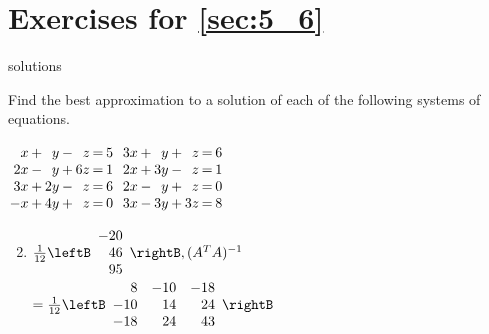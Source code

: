 
\section*{Exercises for \ref{sec:5_6}}

\begin{Filesave}{solutions}
\end{Filesave}

\begin{multicols}{2}
\begin{ex}
Find the best approximation to a solution of each of the following systems of equations.

\begin{exenumerate}
\exitem $\arraycolsep=1pt
\begin{array}[t]{rlrlrcr}
 x & + &  y & - &  z & = & 5 \\
2x & - &  y & + & 6z & = & 1 \\
3x & + & 2y & - &  z & = & 6 \\
-x & + & 4y & + &  z & = & 0 \\
\end{array}$
\exitem $\arraycolsep=1pt
\begin{array}[t]{rlrlrcr}
3x & + &  y & + &  z & = & 6 \\
2x & + & 3y & - &  z & = & 1 \\
2x & - &  y & + &  z & = & 0 \\
3x & - & 3y & + & 3z & = & 8 \\
\end{array}$
\end{exenumerate}
\begin{sol}
\begin{enumerate}[label={\alph*.}]
\setcounter{enumi}{1}
\item $\frac{1}{12}
\leftB \begin{array}{r}
-20 \\
46 \\
95
\end{array} \rightB, (A^TA)^{-1}$ \\
$ = \frac{1}{12}
\leftB \begin{array}{rrr}
  8 & -10 & -18 \\
-10 &  14 &  24 \\
-18 &  24 &  43 
\end{array} \rightB$

\end{enumerate}
\end{sol}
\end{ex}


\end{multicols}
